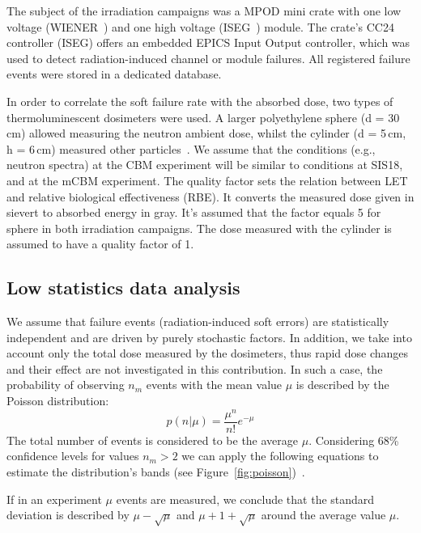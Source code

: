 The subject of the irradiation campaigns was a MPOD mini crate with one low voltage (WIENER~\cite{wiener}) and one high voltage (ISEG~\cite{iseg}) module. The crate's CC24 controller (ISEG) offers an embedded \gls{EPICS} Input Output controller, which was used to detect radiation-induced channel or module failures. All registered  failure events were stored in a dedicated database.  

In order to correlate the soft failure rate with the absorbed dose, two types of thermoluminescent dosimeters were used. A larger polyethylene sphere (d = 30\,cm) allowed measuring the neutron ambient dose, whilst the cylinder (d = 5\,cm, h = 6\,cm) measured other particles~\cite{bonner}. We assume that the conditions (e.g., neutron spectra) at the \gls{CBM} experiment will be similar to conditions at SIS18, and at the \gls{mCBM} experiment. The quality factor sets the relation between \gls{LET} and relative biological effectiveness (\gls{RBE}). It converts the measured dose given in sievert to absorbed energy in gray. It's assumed that the factor equals 5 for sphere in both irradiation campaigns. The dose measured with the cylinder is assumed to have a quality factor of 1.

\subsection{Low statistics data analysis}

We assume that failure events (radiation-induced soft errors) are statistically independent and are driven by purely stochastic factors. In addition, we take into account only the total dose measured by the dosimeters, thus rapid dose changes and their effect are not investigated in this contribution. In such a case, the probability of observing $n_{m}$ events with the mean value $\mu$ is described by the Poisson distribution:\newline
\begin{equation}
    p(n|\mu) = \frac{\mu^{n}}{n!}e^{-\mu}
\end{equation}
The total number of events is considered to be the average $\mu$. Considering 68\% confidence levels for values $n_{m} > 2$ we can apply the following equations to estimate the distribution's bands (see Figure~\ref{fig:poisson})~\cite{schmidt}.

If in an experiment $\mu$ events are measured, we conclude that the standard deviation is described by $\mu - \sqrt{\mu}$ and $\mu + 1 + \sqrt{\mu}$ around the average value $\mu$.


